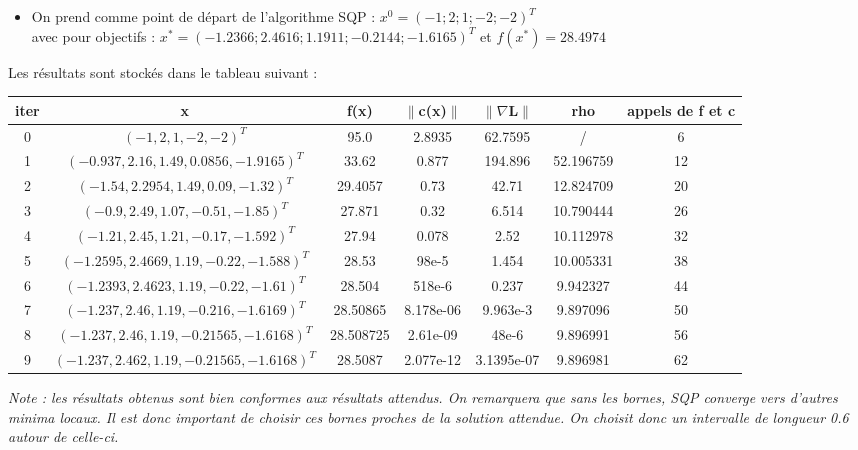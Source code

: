 \begin{itemize}
\item On prend comme point de départ de l'algorithme SQP : $x^0 = (-1 ; 2 ; 1 ; -2 ; -2)^{T}$\\
\indent avec pour objectifs : $x^{*} = (-1.2366 ; 2.4616 ; 1.1911 ; -0.2144 ; -1.6165)^{T}$ et $f(x^{*}) = 28.4974$\\
\end{itemize}
Les résultats sont stockés dans le tableau suivant : \smallbreak
{\renewcommand{\arraystretch}{1.5}\setlength{\tabcolsep}{3pt}
\begin{table}[h]\centering \small\begin{tabular}{|c|c|c|c|c|c|c|}
	\hline
 	iter & x & f(x) & $\| $c(x)$ \|$ & $\|    \nabla $L$  \|$ & rho & appels de f et c\\
	\hline
 	0 & $( -1, 2, 1, -2, -2 )^{T}$ & 95.0 & 2.8935 & 62.7595 & / & 6\\
	\hline
 	1 & $(-0.937, 2.16, 1.49, 0.0856, -1.9165)^{T}$ & 33.62 & 0.877 & 194.896 & 52.196759 & 12\\
	\hline
 	2 & $( -1.54, 2.2954, 1.49, 0.09, -1.32 )^{T}$ & 29.4057 & 0.73 & 42.71 & 12.824709 & 20\\
	\hline
 	3 & $( -0.9, 2.49, 1.07, -0.51, -1.85 )^{T}$ & 27.871 & 0.32 & 6.514 & 10.790444 & 26\\
	\hline
 	4 & $( -1.21, 2.45, 1.21, -0.17, -1.592 )^{T}$ & 27.94 & 0.078 & 2.52 & 10.112978 & 32\\
	\hline
 	5 & $( -1.2595, 2.4669, 1.19, -0.22, -1.588 )^{T}$ & 28.53 & 98e-5 & 1.454 & 10.005331 & 38\\
	\hline
 	6 & $( -1.2393, 2.4623, 1.19, -0.22, -1.61)^{T}$ & 28.504 & 518e-6 & 0.237 & 9.942327 & 44\\
	\hline
 	7 & $( -1.237, 2.46, 1.19, -0.216, -1.6169 )^{T}$ & 28.50865 & 8.178e-06 & 9.963e-3 & 9.897096 & 50\\
	\hline
 	8 & $( -1.237, 2.46, 1.19, -0.21565, -1.6168 )^{T}$ & 28.508725 & 2.61e-09 & 48e-6 & 9.896991 & 56\\
	\hline
 	9 & $( -1.237, 2.462, 1.19, -0.21565, -1.6168 )^{T}$ & 28.5087 & 2.077e-12 & 3.1395e-07 & 9.896981 & 62\\

	\hline
\end{tabular}\end{table}
}\normalsize
\bigbreak
\textit{Note : les résultats obtenus sont bien conformes aux résultats attendus. On remarquera que sans les bornes, SQP converge vers d'autres minima locaux. Il est donc important de choisir ces bornes proches de la solution attendue. On choisit donc un intervalle de longueur 0.6
autour de celle-ci.}
\newpage





